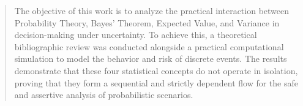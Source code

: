     \begin{abstract}
        The objective of this work is to analyze the practical interaction
        between Probability Theory, Bayes' Theorem, Expected Value, and Variance
         in decision-making under uncertainty. To achieve this, a theoretical
        bibliographic review was conducted alongside a practical computational
        simulation to model the behavior and risk of discrete events. The
        results demonstrate that these four statistical concepts do not operate
        in isolation, proving that they form a sequential and strictly dependent
         flow for the safe and assertive analysis of probabilistic scenarios.
    \end{abstract}
